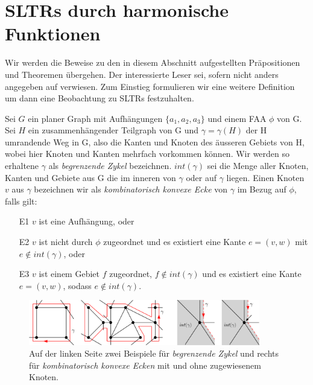 \section{SLTRs durch harmonische Funktionen}\label{harmonic_approach}

Wir werden die Beweise zu den in diesem Abschnitt aufgestellten Präpositionen und Theoremen übergehen. Der interessierte Leser sei, sofern nicht anders angegeben auf \cite{af13} verwiesen. Zum Einstieg formulieren wir eine weitere Definition um dann eine Beobachtung zu SLTRs festzuhalten.

\begin{definition}
Sei $G$ ein planer Graph mit Aufhängungen $\{a_1,a_2,a_3\}$ und einem FAA $\phi$ von G. Sei $H$ ein zusammenhängender Teilgraph von G und $\gamma=\gamma(H)$ der H umrandende Weg in G, also die Kanten und Knoten des äusseren Gebiets von H, wobei hier Knoten und Kanten mehrfach vorkommen können. Wir werden so erhaltene $\gamma$ als \textit{begrenzende Zykel} bezeichnen. $int(\gamma)$ sei die Menge aller Knoten, Kanten und Gebiete aus G die im inneren von $\gamma$ oder auf $\gamma$ liegen. Einen Knoten $v$ aus $\gamma$ bezeichnen wir als \textit{kombinatorisch konvexe Ecke} von $\gamma$ im Bezug auf $\phi$, falls gilt:
\begin{itemize}
\item [E1] $v$ ist eine Aufhängung, oder
\item [E2] $v$ ist nicht durch $\phi$ zugeordnet und es existiert eine Kante $e = (v,w)$ mit $e \notin int(\gamma)$, oder
\item [E3] $v$ ist einem Gebiet $f$ zugeordnet, $f \notin int(\gamma)$ und es existiert eine Kante $e = (v,w)$, sodass $e \notin int(\gamma)$.
\end{itemize}

\end{definition}

\begin{figure}[h]
	\centering
  \includegraphics[width=0.9\textwidth]{corner_def.png}
  \caption{Auf der linken Seite zwei Beispiele für \textit{begrenzende Zykel} und rechts für \textit{kombinatorisch konvexe Ecken} mit und ohne zugewiesenem Knoten.}
\end{figure}

